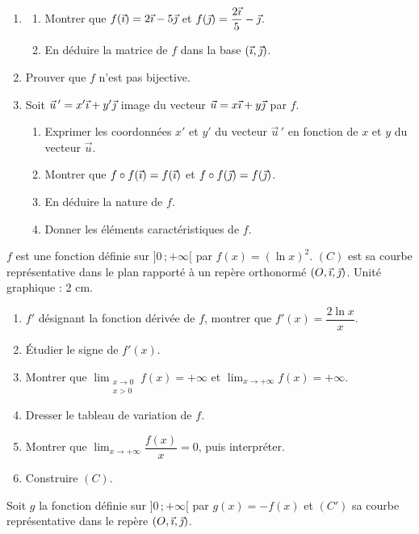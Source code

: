 \documentclass[11pt]{article}
\begin{document}
\begin{enumerate}
  \item \begin{enumerate}[label=\alph*.]
    \item Montrer que $f(\vec{\imath}) = 2\vec{\imath} - 5\vec{\jmath}$ et $f(\vec{\jmath}) = \dfrac{2\vec{\imath}}{5} - \vec{\jmath}$.
    \item En déduire la matrice de $f$ dans la base $(\vec{\imath},\vec{\jmath})$.
  \end{enumerate}
  \item Prouver que $f$ n'est pas bijective.
  \item Soit $\vec{u}\,' = x'\vec{\imath} + y'\vec{\jmath}$ image du vecteur $\vec{u} = x\vec{\imath} + y\vec{\jmath}$ par $f$.
  \begin{enumerate}[label=\alph*.]
    \item Exprimer les coordonnées $x'$ et $y'$ du vecteur $\vec{u}\,'$ en fonction de $x$ et $y$ du vecteur $\vec{u}$.
    \item Montrer que $f \circ f(\vec{\imath}) = f(\vec{\imath})$ et $f \circ f(\vec{\jmath}) = f(\vec{\jmath})$.
    \item En déduire la nature de $f$.
    \item Donner les éléments caractéristiques de $f$.
  \end{enumerate}
\end{enumerate}


$f$ est une fonction définie sur $]0\,;+\infty[$ par $f(x) = (\ln x)^2$. $(C)$ est sa courbe représentative dans le plan rapporté à un repère orthonormé $(O,\vec{\imath},\vec{\jmath})$. Unité graphique : 2 cm.

\begin{enumerate}
  \item $f'$ désignant la fonction dérivée de $f$, montrer que $f'(x) = \dfrac{2\ln x}{x}$.
  \item Étudier le signe de $f'(x)$.
  \item Montrer que $\displaystyle\lim_{\substack{x\to 0 \\ x>0}} f(x) = +\infty$ et $\displaystyle\lim_{x\to+\infty} f(x) = +\infty$.
  \item Dresser le tableau de variation de $f$.
  \item Montrer que $\displaystyle\lim_{x\to+\infty} \dfrac{f(x)}{x} = 0$, puis interpréter.
  \item Construire $(C)$.
\end{enumerate}

Soit $g$ la fonction définie sur $]0\,;+\infty[$ par $g(x) = -f(x)$ et $(C')$ sa courbe représentative dans le repère $(O,\vec{\imath},\vec{\jmath})$.
\end{document}
